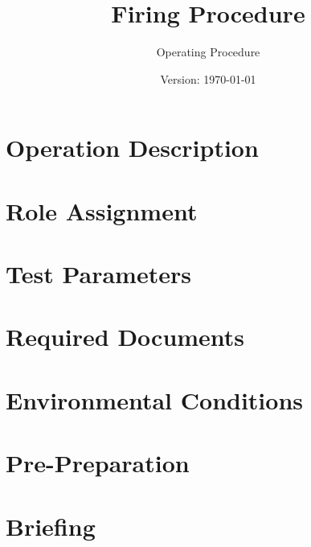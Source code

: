 \documentclass{article}
\title{Firing Procedure}
\author{Operating Procedure}
\date{Version: \isodate\today}
\begin{document}
\maketitle

\thispagestyle{fancy}

\renewcommand{\thesection}{\Alph{section}}

\section{Operation Description}


\section{Role Assignment}


\section{Test Parameters}


\section{Required Documents}


\section{Environmental Conditions}


\newpage

\newtoggle{firing}
\toggletrue{firing}

\renewcommand{\thesection}{\arabic{section}}

\setcounter{section}{0}

\section{Pre-Preparation}


\section{Briefing}

\end{document}
